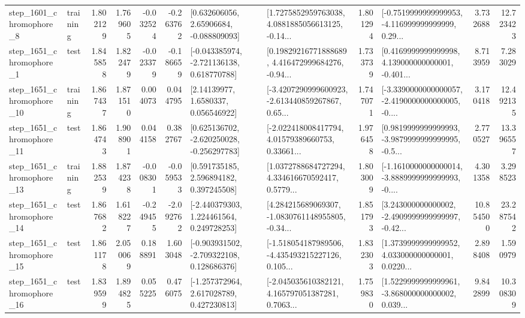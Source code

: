 \begin{tabular}{llrrrrllrlrr}
  step\_1601\_chromophore\_8 &  training &      1.802129 &    1.769605 &     -0.032524 & -0.263762 &     [0.632606056, 2.65906684, -0.088809093] &  [1.7275852959763038, 4.0881885056613125, -0.14... &       1.801294 &  [-0.7519999999999953, -4.116999999999999, 0.29... &            3.732688 &         12.723423 \\
  step\_1651\_chromophore\_1 &      test &      1.845858 &    1.822479 &     -0.023379 & -0.186659 &   [-0.043385974, -2.721136138, 0.618770788] &  [0.19829216771888689, 4.416472999684276, -0.94... &       1.733739 &  [0.4169999999999998, 4.139000000000001, -0.401... &            8.713959 &          7.283029 \\
 step\_1651\_chromophore\_10 &  training &      1.867437 &    1.871510 &      0.004073 &  0.044795 &        [2.14139977, 1.6580337, 0.056546922] &  [-3.4207290999600923, -2.613440859267867, 0.65... &       1.747071 &  [-3.3390000000000057, -2.4190000000000005, -0.... &            3.170418 &         12.492135 \\
 step\_1651\_chromophore\_11 &      test &      1.864743 &    1.908901 &      0.044158 &  0.382767 &   [0.625136702, -2.620250028, -0.256297783] &  [-2.022418008417794, 4.01579389660753, 0.33661... &       1.976458 &  [0.9819999999999993, -3.9879999999999995, -0.5... &            2.770527 &         13.396557 \\
 step\_1651\_chromophore\_13 &  training &      1.882539 &    1.874238 &     -0.008301 & -0.059533 &     [0.591735185, 2.596894182, 0.397245508] &  [1.0372788684727294, 4.334616670592417, 0.5779... &       1.803009 &  [-1.1610000000000014, -3.8889999999999993, -0.... &            4.301358 &          3.298523 \\
 step\_1651\_chromophore\_14 &      test &      1.867682 &    1.618227 &     -0.249455 & -2.092762 &    [-2.440379303, 1.224461564, 0.249728253] &  [4.284215689069307, -1.0830761148955805, -0.34... &       1.851793 &  [3.243000000000002, -2.4909999999999997, -0.42... &           10.854500 &         23.287542 \\
 step\_1651\_chromophore\_15 &      test &      1.861178 &    2.050069 &      0.188891 &  1.603048 &   [-0.903931502, -2.709322108, 0.128686376] &  [-1.518054187989506, -4.435493215227126, 0.105... &       1.832303 &  [1.3739999999999952, 4.033000000000001, 0.0220... &            2.898408 &          1.590979 \\
 step\_1651\_chromophore\_16 &      test &      1.839599 &    1.894825 &      0.055225 &  0.476075 &    [-1.257372964, 2.617028789, 0.427230813] &  [-2.045035610382121, 4.165797051387281, 0.7063... &       1.759830 &  [1.5229999999999961, -3.868000000000002, 0.039... &            9.842899 &         10.308309 \\

\end{tabular}
